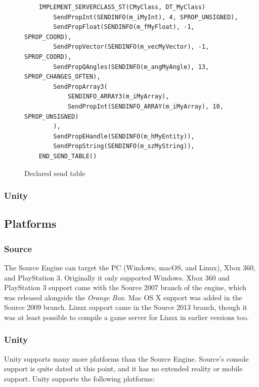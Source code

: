\documentclass[a4paper, 12pt]{scrartcl}
\begin{document}
\begin{figure}[!htp]
  \begin{verbatim}
    IMPLEMENT_SERVERCLASS_ST(CMyClass, DT_MyClass)
        SendPropInt(SENDINFO(m_iMyInt), 4, SPROP_UNSIGNED),
        SendPropFloat(SENDINFO(m_fMyFloat), -1, SPROP_COORD),
        SendPropVector(SENDINFO(m_vecMyVector), -1, SPROP_COORD),
        SendPropQAngles(SENDINFO(m_angMyAngle), 13, SPROP_CHANGES_OFTEN),
        SendPropArray3(
            SENDINFO_ARRAY3(m_iMyArray),
            SendPropInt(SENDINFO_ARRAY(m_iMyArray), 10, SPROP_UNSIGNED)
        ),
        SendPropEHandle(SENDINFO(m_hMyEntity)),
        SendPropString(SENDINFO(m_szMyString)),
    END_SEND_TABLE()
  \end{verbatim}
  \caption{Declared send table}
  \label{fig:source_net_send_table}
\end{figure}

\subsubsection{Unity}

\subsection{Platforms}
\subsubsection{Source}
The Source Engine can target the PC (Windows, macOS, and Linux), Xbox 360, and PlayStation 3. Originally it only supported Windows. Xbox 360 and PlayStation 3 support came with the Source 2007 branch of the engine, which was released alongside the \textit{Orange Box}. Mac OS X support was added in the Source 2009 branch. Linux support came in the Source 2013 branch, though it was at least possible to compile a game server for Linux in earlier versions too.

\subsubsection{Unity}
Unity supports many more platforms than the Source Engine. Source's console support is quite dated at this point, and it has no extended reality or mobile support. Unity supports the following platforms:
\end{document}
